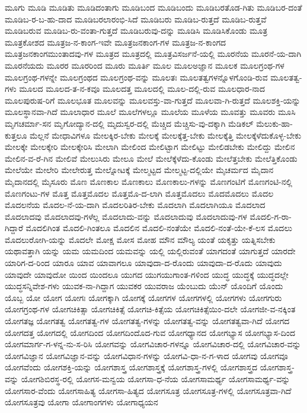 {ಮೂಗು
ಮೂಡಿ
ಮೂಡಿತು
ಮೂಡಿದಂತಾಗು
ಮೂಡಿಬಂದ
ಮೂಡಿಬಂದು
ಮೂಡಿಬರತೊಡ-ಗಿತು
ಮೂಡಿಬರ-ದಂತೆ
ಮೂಡಿಬ-ರ-ಬ-ಹು-ದಾದ
ಮೂಡಿಬರಲಾರಂಭಿ-ಸಿದೆ
ಮೂಡಿಬರು
ಮೂಡಿಬ-ರುತ್ತದೆ
ಮೂಡಿಬ-ರುತ್ತವೆ
ಮೂಡಿಬರುವ
ಮೂಡಿಬ-ರು-ವಂತಾ-ಗುತ್ತದೆ
ಮೂಡಿಬರುವು-ದನ್ನು
ಮೂಡಿಸಿ
ಮೂಡಿಸಿಕೊಂಡು
ಮೂತ್ರ
ಮೂತ್ರಕೋಶದ
ಮೂತ್ರಜ-ನ-ಕಾಂಗ-ಇವೇ
ಮೂತ್ರಜನಕಾಂಗ-ಗಳ
ಮೂತ್ರಜ-ನ-ಕಾಂಗದ
ಮೂತ್ರಜನಕಾಂಗಮುಂತಾದವು-ಗಳ
ಮೂತ್ರದ
ಮೂತ್ರದಲ್ಲಿ
ಮೂತ್ರವಿಸರ್ಜನೆ-ಯಲ್ಲಿ
ಮೂರನೆಯ
ಮೂರನೆ-ಯ-ದಾಗಿ
ಮೂರನೆಯದು
ಮೂರರ
ಮೂರರಿಂದ
ಮೂರು
ಮೂರ್ತಿ
ಮೂಲ
ಮೂಲಅಜ್ಞಾನ
ಮೂಲಕ
ಮೂಲಗ್ರಂಥ-ಗಳ
ಮೂಲಗ್ರಂಥ-ಗಳನ್ನೇ
ಮೂಲಗ್ರಂಥದ
ಮೂಲಗ್ರಂಥ-ವನ್ನು
ಮೂಲತಃ
ಮೂಲತತ್ವಗಳನ್ನೊಳಗೊಂಡಿ-ರುವ
ಮೂಲತತ್ವ-ಗಳು
ಮೂಲದ
ಮೂಲದ-ತ-ನ-ಕವೂ
ಮೂಲದತ್ತ
ಮೂಲದಲ್ಲಿ
ಮೂಲ-ದಲ್ಲಿ-ರುವ
ಮೂಲಧಾರ-ನಾದ
ಮೂಲಪುರುಷ-ರಿಗೆ
ಮೂಲಭೂತ
ಮೂಲವನ್ನು
ಮೂಲವಸ್ತು-ವಾ-ಗುತ್ತದೆ
ಮೂಲವಾ-ಗಿ-ರುತ್ತದೆ
ಮೂಲಶಕ್ತಿ-ಯನ್ನು
ಮೂಲಸ್ಥಾನವಾ-ಗಿದೆ
ಮೂಲಾಧಾರ
ಮೂಲೆ
ಮೂಲೆಗಳಲ್ಲೂ
ಮೂಲೆಯ
ಮೂಳೆಯ
ಮೂವತ್ತು
ಮೂವರು
ಮೂಸಿ
ಮೃಗಚರ್ಮಾ-ಸನ
ಮೃಗೋದ್ಯಾನ-ದಲ್ಲಿ
ಮೃದುಸ್ವರ-ದಲ್ಲಿ
ಮೆಚ್ಚಿದ
ಮೆಚ್ಚಿಸು-ವು-ದಕ್ಕಾಗಿ
ಮೆಡಿಕಲ್
ಮೆಲುಕು-ಹಾ-ಕುತ್ತಲೂ
ಮೆಲ್ಲನೆ
ಮೇಧಾವಿಗಳೂ
ಮೇಲಕ್ಕಿರ-ಬೇಕು
ಮೇಲಕ್ಕೆ
ಮೇಲಕ್ಕೆತ್ತ-ಬೇಕು
ಮೇಲಕ್ಕೆತ್ತಿ
ಮೇಲಕ್ಕೆಳೆದುಕೊಳ್ಳ-ಬೇಕು
ಮೇಲಕ್ಕೇ
ಮೇಲಕ್ಕೇರಿ
ಮೇಲಕ್ಕೇರಿಸಿ
ಮೇಲಾಗಿ
ಮೇಲಿಂದ
ಮೇಲಿಟ್ಟಾಗ
ಮೇಲಿಟ್ಟು
ಮೇಲಿಡಬೇಕು
ಮೇಲಿದ್ದು
ಮೇಲಿನ
ಮೇಲಿನ-ವ-ರೆ-ಗಿನ
ಮೇಲಿವೆ
ಮೇಲುಸಿರು
ಮೇಲೂ
ಮೇಲೆ
ಮೇಲೆಕ್ಕೆಳೆದು-ಕೊಂಡು
ಮೇಲೆತ್ತಬೇಕು
ಮೇಲೆತ್ತಿಕೊಂಡು
ಮೇಲೆಯೇ
ಮೇಲೇರಿ
ಮೇಲೇರುತ್ತ
ಮೇಲ್ನೋಟಕ್ಕೆ
ಮೇಲ್ಮಟ್ಟದ
ಮೇಲ್ಮಟ್ಟ-ದಲ್ಲಿಯೇ
ಮೈಚರ್ಮದ
ಮೈದಾನ
ಮೈದಾನದಲ್ಲಿ
ಮೈಸೂರು
ಮೊಣ
ಮೊಣಕಾಲ
ಮೊಣಕಾಲು
ಮೊಣಕಾಲು-ಗಳನ್ನು
ಮೊಣಗಂಟಿಗೆ
ಮೊಣಗಂಟಿ-ನಲ್ಲಿ
ಮೊಣಗಂಟು-ಗಳ
ಮೊತ್ತ
ಮೊತ್ತಮೊದಲ
ಮೊತ್ತಮೊ-ದ-ಲಾಗಿ
ಮೊತ್ತಮೊದಲು
ಮೊದಮೊದಲು
ಮೊದಲ
ಮೊದಲನೆಯ
ಮೊದಲ-ನೆ-ಯ-ದಾಗಿ
ಮೊದಲರಿತಿರ-ಬೇಕು
ಮೊದಲಾಗಿ
ಮೊದಲಾಗಿಯೂ
ಮೊದಲಾದ
ಮೊದಲಾದವು
ಮೊದಲಾದವು-ಗಳೆಲ್ಲ
ಮೊದಲಾದು-ವನ್ನು
ಮೊದಲಾದುವು
ಮೊದಲಾದುವು-ಗಳ
ಮೊದಲಿ-ಗ-ರಾ-ಗಿದ್ದಾರೆ
ಮೊದಲಿಗಿಂತ
ಮೊದಲಿ-ಗಿಂತಲೂ
ಮೊದಲಿನ
ಮೊದಲಿ-ನಂತೆಯೇ
ಮೊದಲಿ-ನಂತೆ-ಯೇ-ಕೆ-ಲಸ
ಮೊದಲು
ಮೊದಲುರೋಗಿ-ಯನ್ನು
ಮೊದಲೇ
ಮೋಕ್ಷ
ಮೋಸ
ಮೋಹ
ಮೌನ
ಮೌಲ್ಯ
ಯಂತೆ
ಯಕೃತ್ತು
ಯತ್ನಿಸಬೇಕು
ಯಥಾವತ್ತಾಗಿ
ಯನ್ನು
ಯಮ
ಯಮದಿಂದ
ಯಮವನ್ನು
ಯಲ್ಲಿ
ಯಲ್ಲಿರುವಂತೆ
ಯಾಗದಂತೆ
ಯಾಗುತ್ತದೆ
ಯಾರದೇ
ಯಾರಿಗ-ದ-ರಿಂದ
ಯಾರೂ
ಯಾವ
ಯಾವಾಗಲೂ
ಯಾವುದಾ-ದ-ರೊಂದು
ಯಾವುದಾ-ದ-ರೊದು
ಯಾವುದು
ಯಾವುದೇ
ಯಾವುದೋ
ಯಿಂದ
ಯಿಂದಲೂ
ಯುಗದ
ಯುಗಯುಗಾಂತ-ಗಳಿಂದ
ಯುದ್ಧ
ಯುದ್ಧಕ್ಕೆ
ಯುದ್ಧದಲ್ಲೇ
ಯುದ್ಧಸನ್ನಿವೇಶ-ಗಳು
ಯುವಕ-ನಾ-ಗಿದ್ದಾಗ
ಯುವಕರ
ಯುವರಾಜ
ಯೆಂಬುದು
ಯೆುನ್
ಯೊಂದಿಗೆ
ಯೊಂದು
ಯೊಬ್ಬ
ಯೋ
ಯೋಗ
ಯೋಗಃ
ಯೋಗಕ್ಕಾಗಿ
ಯೋಗಕ್ಕೆ
ಯೋಗಗಳ
ಯೋಗಗಳಲ್ಲಿ
ಯೋಗಗಳು
ಯೋಗಗುರು
ಯೋಗಗ್ರಂಥ-ಗಳ
ಯೋಗಚಿಕಿತ್ಸಾ
ಯೋಗಚಿಕಿತ್ಸೆ
ಯೋಗಚಿ-ಕಿತ್ಸೆಯ
ಯೋಗಚಿಕಿತ್ಸೆಯಿಂ-ದಲೇ
ಯೋಗಜೀ-ವ-ನಕ್ಕಿಂತ
ಯೋಗತಜ್ಞ
ಯೋಗತತ್ವ
ಯೋಗತತ್ವ-ಗಳ
ಯೋಗತತ್ವ-ಗಳನ್ನು
ಯೋಗತತ್ವ-ವನ್ನು
ಯೋಗತತ್ವವಾ-ಗಿದೆ
ಯೋಗದ
ಯೋಗದತ್ತ
ಯೋಗದಲ್ಲಿ
ಯೋಗದಿಂದ
ಯೋಗದಿಂದೊದ-ಗುವ
ಯೋಗಧ್ಯಾನದ
ಯೋಗಭ್ಯಾಸ
ಯೋಗಭ್ಯಾಸ-ದಿಂದ
ಯೋಗಮಾರ್ಗ-ಗ-ಳನ್ನ-ನು-ಸ-ರಿಸಿ
ಯೋಗವನ್ನು
ಯೋಗವಿಚಾರ-ಗಳನ್ನೂ
ಯೋಗವಿಚಾರ-ದಲ್ಲಿ
ಯೋಗವಿಚಾರ-ವನ್ನು
ಯೋಗವಿಜ್ಞಾನ
ಯೋಗವಿಜ್ಞಾನ-ವನ್ನು
ಯೋಗವಿಧಾನ-ಗಳನ್ನು
ಯೋಗವಿ-ಧಾ-ನ-ಗ-ಳಾದ
ಯೋಗವು
ಯೋಗವೂ
ಯೋಗವೆಂದು
ಯೋಗಶಕ್ತಿ-ಯನ್ನು
ಯೋಗಶಾಸ್ತ್ರ
ಯೋಗಶಾಸ್ತ್ರಕ್ಕೆ
ಯೋಗಶಾಸ್ತ್ರ-ಗಳಲ್ಲಿ
ಯೋಗಶಾಸ್ತ್ರದ
ಯೋಗಶಾಸ್ತ್ರ-ವನ್ನು
ಯೋಗಶಿಬಿರಸ್ಥ-ರಲ್ಲಿ
ಯೋಗಸ-ಮನ್ವಯ
ಯೋಗಸಾ-ಧ-ನೆಯ
ಯೋಗಸಾಮರ್ಥ್ಯ
ಯೋಗಸಾಮರ್ಥ್ಯ-ವನ್ನು
ಯೋಗಸಾರ-ವೆಂದು
ಯೋಗಸಾಹಿತ್ಯ
ಯೋಗಸಾ-ಹಿತ್ಯದ
ಯೋಗಸೂತ್ರ
ಯೋಗಸೂತ್ರ-ಗಳಲ್ಲಿ
ಯೋಗಸೂತ್ರವಾ-ಗಿದೆ
ಯೋಗಸೂತ್ರವು
ಯೋಗಾ
ಯೋಗಾಂಗಗಳು
ಯೋಗಾಧ್ಯಯನ
}
